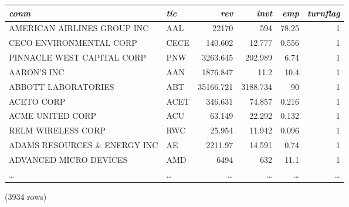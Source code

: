 \begin{center}
\begin{tabular}{l | l | r | r | r | r}
\textit{conm} & \textit{tic} & \textit{rev} & \textit{invt} & \textit{emp} & \textit{turnflag} \\
\hline
AMERICAN AIRLINES GROUP INC & AAL & 22170 & 594 & 78.25 & 1 \\
CECO ENVIRONMENTAL CORP & CECE & 140.602 & 12.777 & 0.556 & 1 \\
PINNACLE WEST CAPITAL CORP & PNW & 3263.645 & 202.989 & 6.74 & 1 \\
AARON'S INC & AAN & 1876.847 & 11.2 & 10.4 & 1 \\
ABBOTT LABORATORIES & ABT & 35166.721 & 3188.734 & 90 & 1 \\
ACETO CORP & ACET & 346.631 & 74.857 & 0.216 & 1 \\
ACME UNITED CORP & ACU & 63.149 & 22.292 & 0.132 & 1 \\
RELM WIRELESS CORP & RWC & 25.954 & 11.942 & 0.096 & 1 \\
ADAMS RESOURCES \& ENERGY INC & AE & 2211.97 & 14.591 & 0.74 & 1 \\
ADVANCED MICRO DEVICES & AMD & 6494 & 632 & 11.1 & 1 \\
\ldots & \ldots & \ldots & \ldots & \ldots & \ldots \\
\end{tabular}

\noindent (3934 rows) \\
\end{center}

